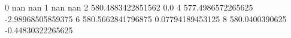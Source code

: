 0 nan nan
1 nan nan
2 580.4883422851562 0.0
4 577.4986572265625 -2.98968505859375
6 580.5662841796875 0.07794189453125
8 580.0400390625 -0.44830322265625
